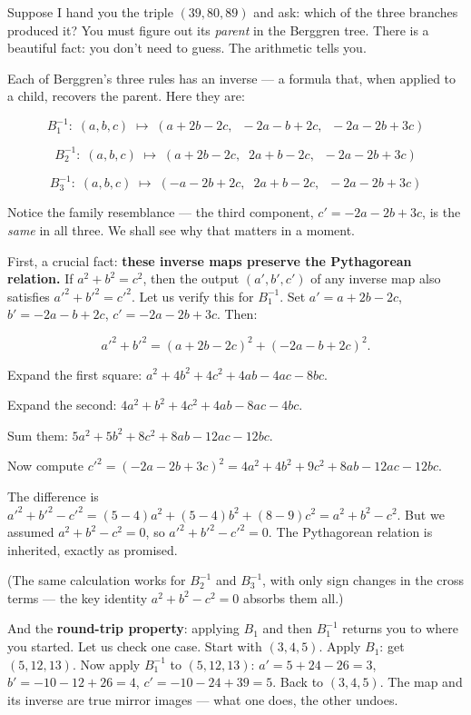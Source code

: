 

Suppose I hand you the triple $(39, 80, 89)$ and ask: which of the three branches produced it? You must figure out its \textit{parent} in the Berggren tree. There is a beautiful fact: you don't need to guess. The arithmetic tells you.

Each of Berggren's three rules has an inverse --- a formula that, when applied to a child, recovers the parent. Here they are:

\[B_1^{-1}:\; (a,b,c) \;\longmapsto\; (a + 2b - 2c,\;\; -2a - b + 2c,\;\; -2a - 2b + 3c)\]

\[B_2^{-1}:\; (a,b,c) \;\longmapsto\; (a + 2b - 2c,\;\; 2a + b - 2c,\;\; -2a - 2b + 3c)\]

\[B_3^{-1}:\; (a,b,c) \;\longmapsto\; (-a - 2b + 2c,\;\; 2a + b - 2c,\;\; -2a - 2b + 3c)\]

Notice the family resemblance --- the third component, $c' = -2a - 2b + 3c$, is the \textit{same} in all three. We shall see why that matters in a moment.

First, a crucial fact: \textbf{these inverse maps preserve the Pythagorean relation.} If $a^2 + b^2 = c^2$, then the output $(a', b', c')$ of any inverse map also satisfies ${a'}^2 + {b'}^2 = {c'}^2$. Let us verify this for $B_1^{-1}$. Set $a' = a + 2b - 2c$, $b' = -2a - b + 2c$, $c' = -2a - 2b + 3c$. Then:

\[{a'}^2 + {b'}^2 = (a + 2b - 2c)^2 + (-2a - b + 2c)^2.\]

Expand the first square: $a^2 + 4b^2 + 4c^2 + 4ab - 4ac - 8bc$.

Expand the second: $4a^2 + b^2 + 4c^2 + 4ab - 8ac - 4bc$.

Sum them: $5a^2 + 5b^2 + 8c^2 + 8ab - 12ac - 12bc$.

Now compute ${c'}^2 = (-2a - 2b + 3c)^2 = 4a^2 + 4b^2 + 9c^2 + 8ab - 12ac - 12bc$.

The difference is ${a'}^2 + {b'}^2 - {c'}^2 = (5-4)a^2 + (5-4)b^2 + (8-9)c^2 = a^2 + b^2 - c^2$. But we assumed $a^2 + b^2 - c^2 = 0$, so ${a'}^2 + {b'}^2 - {c'}^2 = 0$. The Pythagorean relation is inherited, exactly as promised.

(The same calculation works for $B_2^{-1}$ and $B_3^{-1}$, with only sign changes in the cross terms --- the key identity $a^2 + b^2 - c^2 = 0$ absorbs them all.)

And the \textbf{round-trip property}: applying $B_1$ and then $B_1^{-1}$ returns you to where you started. Let us check one case. Start with $(3, 4, 5)$. Apply $B_1$: get $(5, 12, 13)$. Now apply $B_1^{-1}$ to $(5, 12, 13)$: $a' = 5 + 24 - 26 = 3$, $b' = -10 - 12 + 26 = 4$, $c' = -10 - 24 + 39 = 5$. Back to $(3, 4, 5)$. The map and its inverse are true mirror images --- what one does, the other undoes.

